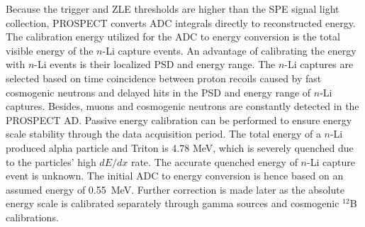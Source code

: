 
Because the trigger and ZLE thresholds are higher than the SPE signal light collection, PROSPECT converts ADC integrals directly to reconstructed energy.
The calibration energy utilized for the ADC to energy conversion is the total visible energy of the $n$-Li capture events.
An advantage of calibrating the energy with $n$-Li events is their localized PSD and energy range.
The $n$-Li captures are selected based on time coincidence between proton recoils caused by fast cosmogenic neutrons and delayed hits in the PSD and energy range of $n$-Li captures.
Besides, muons and cosmogenic neutrons are constantly detected in the PROSPECT AD.
Passive energy calibration can be performed to ensure energy scale stability through the data acquisition period.
The total energy of a $n$-Li produced alpha particle and Triton is 4.78 MeV, which is severely quenched due to the particles' high $dE/dx$ rate.
The accurate quenched energy of $n$-Li capture event is unknown.
The initial ADC to energy conversion is hence based on an assumed energy of 0.55~MeV.
Further correction is made later as the absolute energy scale is calibrated separately through gamma sources and cosmogenic $^{12}$B calibrations.

